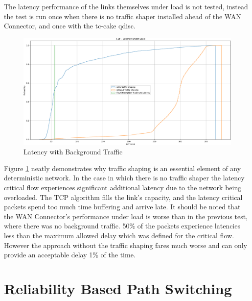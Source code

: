 The latency performance of the links themselves under load is not tested, instead the test is run once when there is no traffic shaper installed ahead of the WAN Connector, and once with the tc-cake qdisc.

\begin{figure}[h]
    \centering
        \includegraphics[height=0.66\textwidth,width=\textwidth]{fig/rrul_cdf.png}
        \caption{Latency with Background Traffic}
        \label{fig:rrul_cdf}
\end{figure}

Figure \ref{fig:rrul_cdf} neatly demonstrates why traffic shaping is an essential element of any deterministic network. In the case in which there is no traffic shaper the latency critical flow experiences significant additional latency due to the network being overloaded. The TCP algorithm fills the link's capacity, and the latency critical packets spend too much time buffering and arrive late. It should be noted that the WAN Connector's performance under load is worse than in the previous test, where there was no background traffic. 50\% of the packets experience latencies less than the maximum allowed delay which was defined for the critical flow. However the approach without the traffic shaping fares much worse and can only provide an acceptable delay 1\% of the time.

\section{Reliability Based Path Switching}

